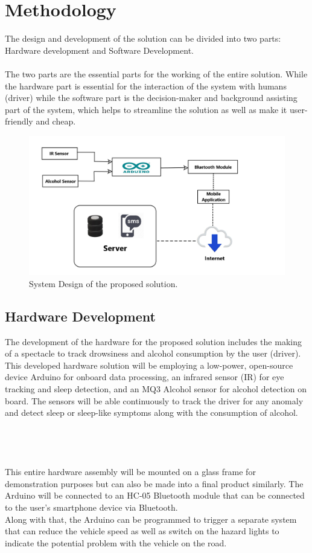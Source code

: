 \documentclass[12pt]{article}
\begin{document}
\section{Methodology}
The design and development of the solution can be divided into two parts: Hardware development and Software Development. 
\\ 
\\ 
The two parts are the essential parts for the working of the entire solution.  While the hardware part is essential for the interaction of the system with humans (driver) while the software part is the decision-maker and background assisting part of the system, which helps to streamline the solution as well as make it user-friendly and cheap. 

\begin{figure}[ht]

\centering
\includegraphics[width=\textwidth]{eld_report.jpg}
\caption{System Design of the proposed solution.}

\end{figure}

\subsection{Hardware Development}
The development of the hardware for the proposed solution includes the making of a spectacle to track drowsiness and alcohol consumption by the user (driver). This developed hardware solution will be employing a low-power, open-source device Arduino for onboard data processing, an infrared sensor (IR) for eye tracking and sleep detection, and an MQ3 Alcohol sensor for alcohol detection on board. The sensors will be able continuously to track the driver for any anomaly and detect sleep or sleep-like symptoms along with the consumption of alcohol. 
\\
\\
\\
\\
\\
This entire hardware assembly will be mounted on a glass frame for demonstration purposes but can also be made into a final product similarly. The Arduino will be connected to an HC-05 Bluetooth module that can be connected to the user's smartphone device via Bluetooth. 
\\
Along with that, the Arduino can be programmed to trigger a separate system that can reduce the vehicle speed as well as switch on the hazard lights to indicate the potential problem with the vehicle on the road. 
\\
\\
\end{document}
